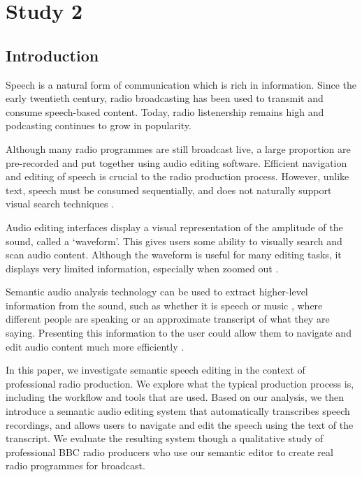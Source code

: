 \chapter{Study 2}

\section{Introduction}
Speech is a natural form of communication which is rich in information. Since
the early twentieth century, radio broadcasting has been used to transmit and
consume speech-based content. Today, radio listenership remains high and
podcasting continues to grow in popularity. 

Although many radio programmes are still broadcast live, a large proportion are
pre-recorded and put together using audio editing software. Efficient
navigation and editing of speech is crucial to the radio production process.
However, unlike text, speech must be consumed sequentially, and does not
naturally support visual search techniques \citep{Wolfe2004}. 

Audio editing interfaces display a visual representation of the amplitude of
the sound, called a `waveform'. This gives users some ability to visually
search and scan audio content. Although the waveform is useful for many editing
tasks, it displays very limited information, especially when zoomed out
\citep{Loviscach2011}.

Semantic audio analysis technology can be used to extract higher-level
information from the sound, such as whether it is speech or music
\citep{Panagiotakis2005}, where different people are speaking
\citep{AngueraMiro2012} or an approximate transcript of what they are saying.
Presenting this information to the user could allow them to navigate and edit
audio content much more efficiently \citep{Whittaker2004}.

In this paper, we investigate semantic speech editing in the context of
professional radio production. We explore what the typical production process
is, including the workflow and tools that are used. Based on our
analysis, we then introduce a semantic audio editing system that automatically
transcribes speech recordings, and allows users to navigate and edit the speech
using the text of the transcript.  We evaluate the resulting system though a
qualitative study of professional BBC radio producers who use our semantic
editor to create real radio programmes for broadcast.


